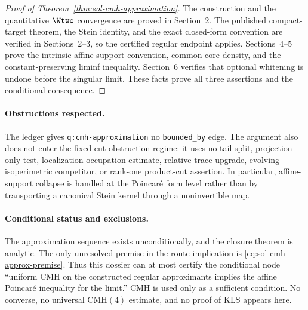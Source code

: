 \documentclass[../main.tex]{subfiles}
\begin{document}
\begin{proof}[Proof of Theorem~\ref{thm:sol-cmh-approximation}]
The construction and the quantitative $\Wtwo$ convergence are proved in Section~2.  The
published compact-target theorem, the Stein identity, and the exact closed-form convention are
verified in Sections~2--3, so the certified regular endpoint applies.  Sections~4--5 prove the
intrinsic affine-support convention, common-core density, and the constant-preserving liminf
inequality.  Section~6 verifies that optional whitening is undone before the singular limit.
These facts prove all three assertions and the conditional consequence.
\end{proof}

\paragraph{Obstructions respected.}
The ledger gives \texttt{q:cmh-approximation} no \texttt{bounded\_by} edge.  The argument also
does not enter the fixed-cut obstruction regime: it uses no tail split, projection-only test,
localization occupation estimate, relative trace upgrade, evolving isoperimetric competitor, or
rank-one product-cut assertion.  In particular, affine-support collapse is handled at the
Poincar\'e form level rather than by transporting a canonical Stein kernel through a
noninvertible map.

\paragraph{Conditional status and exclusions.}
The approximation sequence exists unconditionally, and the closure theorem is analytic.  The
only unresolved premise in the route implication is
\eqref{eq:sol-cmh-approx-premise}.  Thus this dossier can at most certify the conditional node
``uniform CMH on the constructed regular approximants implies the affine Poincar\'e inequality
for the limit.''  CMH is used only as a sufficient condition.  No converse, no universal
$\mathrm{CMH}(4)$ estimate, and no proof of KLS appears here.
\end{document}
